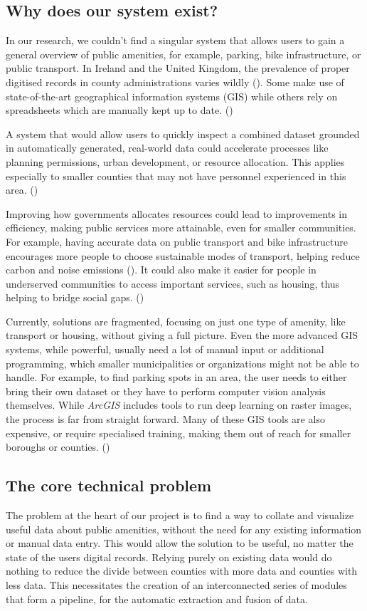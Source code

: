 \subsection{Why does our system exist?}
In our research, we couldn't find a singular system that allows users to gain a
general overview of public amenities, for example, parking, bike infrastructure,
or public transport. In Ireland and the United Kingdom, the prevalence of proper
digitised records in county administrations varies wildly
(\cite{WebAccessibilityIreland}). Some make use of state-of-the-art geographical
information systems (GIS) while others rely on spreadsheets which are manually
kept up to date. (\cite{mcguirk2001changing})

A system that would allow users to quickly inspect a combined dataset
grounded in automatically generated, real-world data could accelerate processes
like planning permissions, urban development, or resource allocation. This
applies especially to smaller counties that may not have personnel experienced
in this area. (\cite{clark2002amenities})

Improving how governments allocates resources could lead to
improvements in efficiency, making public services more attainable, even for
smaller communities. For example, having accurate data on public transport and
bike infrastructure encourages more people to choose sustainable modes of
transport, helping reduce carbon and noise emissions (\cite{MUGION20181566}). It
could also make it easier for people in underserved communities to access
important services, such as housing, thus helping to bridge social gaps.
(\cite{allen2015understanding})

\newpage{}

Currently, solutions are fragmented, focusing on just one type of
amenity, like transport or housing, without giving a full picture. Even the more
advanced GIS systems, while powerful, usually need a lot of manual input or
additional programming, which smaller municipalities or organizations might not
be able to handle. For example, to find parking spots in an area, the user needs to
either bring their own dataset or they have to perform computer vision analysis
themselves. While \textit{ArcGIS} includes tools to run deep learning on raster
images, the process is far from straight forward. Many of these GIS tools are also
expensive, or require specialised training, making them out of reach for smaller
boroughs or counties. (\cite{kaufmann2022scaling})

\subsection{The core technical problem}
The problem at the heart of our project is to find a way to collate and
visualize useful data about public amenities, without the need for any existing
information or manual data entry. This would allow the solution to be useful, no
matter the state of the users digital records. Relying purely on existing data
would do nothing to reduce the divide between counties with more data and
counties with less data. This necessitates the creation of an interconnected
series of modules that form a pipeline, for the automatic extraction and fusion
of data.

